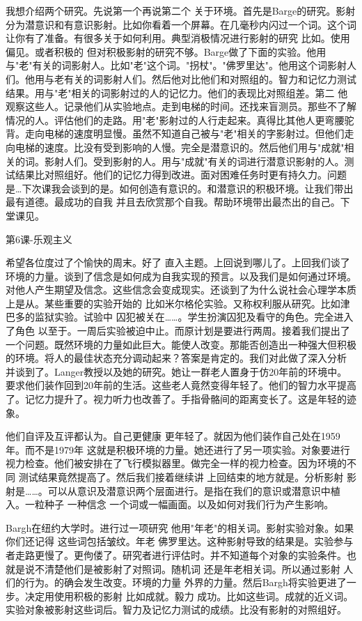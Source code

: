 我想介绍两个研究。先说第一个再说第二个 关于环境。首先是Barge的研究。影射分为潜意识和有意识影射。比如你看着一个屏幕。在几毫秒内闪过一个词。这个词让你有了准备。有很多关于如何利用。典型消极情况进行影射的研究 比如。使用偏见。或者积极的 但对积极影射的研究不够。Barge做了下面的实验。他用与"老"有关的词影射人。比如"老"这个词。"拐杖"。"佛罗里达"。他用这个词影射人们。他用与老有关的词影射人们。然后他对比他们和对照组的。智力和记忆力测试结果。用与"老"相关的词影射过的人的记忆力。他们的表现比对照组差。第二 他观察这些人。记录他们从实验地点。走到电梯的时间。还找来盲测员。那些不了解情况的人。评估他们的走路。用"老"影射过的人行走起来。真得比其他人更弯腰驼背。走向电梯的速度明显慢。虽然不知道自己被与"老"相关的字影射过。但他们走向电梯的速度。比没有受到影响的人慢。完全是潜意识的。然后他们用与"成就"相关的词。影射人们。受到影射的人。用与"成就"有关的词进行潜意识影射的人。测试结果比对照组好。他们的记忆力得到改进。面对困难任务时更有持久力。问题是…下次课我会谈到的是。如何创造有意识的。和潜意识的积极环境。让我们带出最有道德。最成功的自我 并且去欣赏那个自我。帮助环境带出最杰出的自己。下堂课见。 

第6课-乐观主义 

希望各位度过了个愉快的周末。好了 直入主题。上回说到哪儿了。上回我们谈了环境的力量。谈到了信念是如何成为自我实现的预言。以及我们是如何通过环境。对他人产生期望及信念。这些信念会变成现实。还谈到了为什么说社会心理学本质上是从。某些重要的实验开始的 比如米尔格伦实验。又称权利服从研究。比如津巴多的监狱实验。试验中 囚犯被关在……。学生扮演囚犯及看守的角色。完全进入了角色 以至于。一周后实验被迫中止。而原计划是要进行两周。接着我们提出了一个问题。既然环境的力量如此巨大。能使人改变。那能否创造出一种强大但积极的环境。将人的最佳状态充分调动起来？答案是肯定的。我们对此做了深入分析 并谈到了。Langer教授以及她的研究。她让一群老人置身于仿20年前的环境中。要求他们装作回到20年前的生活。这些老人竟然变得年轻了。他们的智力水平提高了。记忆力提升了。视力听力也改善了。手指骨骼间的距离变长了。这是年轻的迹象。 

他们自评及互评都认为。自己更健康 更年轻了。就因为他们装作自己处在1959年。而不是1979年 这就是积极环境的力量。她还进行了另一项实验。对象要进行视力检查。他们被安排在了飞行模拟器里。做完全一样的视力检查。因为环境的不同 测试结果竟然提高了。然后我们接着继续讲 上回结束的地方就是。分析影射 影射是……。可以从意识及潜意识两个层面进行。是指在我们的意识或潜意识中植入。一粒种子 一种信念 一个词或一幅画面。以及如何对我们行为产生影响。 

Bargh在纽约大学时。进行过一项研究 他用"年老"的相关词。影射实验对象。如果你们还记得 这些词包括皱纹。年老 佛罗里达。这种影射导致的结果是。实验参与者走路更慢了。更佝偻了。研究者进行评估时。并不知道每个对象的实验条件。也就是说不清楚他们是被影射了对照词。随机词 还是年老相关词。所以通过影射 人们的行为。的确会发生改变。环境的力量 外界的力量。然后Bargh将实验更进了一步。决定用使用积极的影射 比如成就。毅力 成功。比如这些词。成就的近义词。实验对象被影射这些词后。智力及记忆力测试的成绩。比没有影射的对照组好。 

